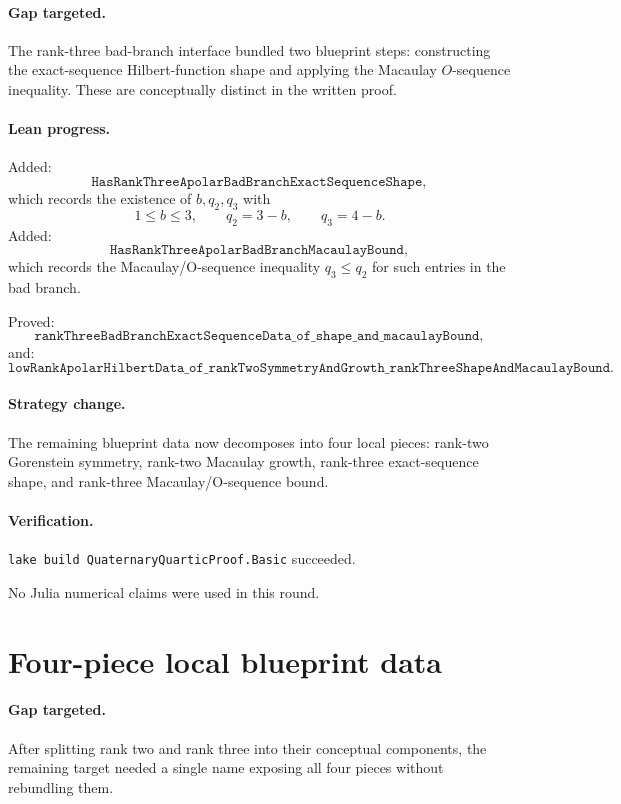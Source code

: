 \documentclass[11pt]{article}
\begin{document}
\paragraph{Gap targeted.}
The rank-three bad-branch interface bundled two blueprint steps: constructing
the exact-sequence Hilbert-function shape and applying the Macaulay
\(O\)-sequence inequality.  These are conceptually distinct in the written
proof.

\paragraph{Lean progress.}
Added:
\[
\texttt{HasRankThreeApolarBadBranchExactSequenceShape},
\]
which records the existence of \(b,q_2,q_3\) with
\[
1\le b\le3,\qquad q_2=3-b,\qquad q_3=4-b.
\]
Added:
\[
\texttt{HasRankThreeApolarBadBranchMacaulayBound},
\]
which records the Macaulay/O-sequence inequality \(q_3\le q_2\) for such
entries in the bad branch.

Proved:
\[
\texttt{rankThreeBadBranchExactSequenceData\_of\_shape\_and\_macaulayBound},
\]
and:
\[
\texttt{lowRankApolarHilbertData\_of\_rankTwoSymmetryAndGrowth\_rankThreeShapeAndMacaulayBound}.
\]

\paragraph{Strategy change.}
The remaining blueprint data now decomposes into four local pieces:
rank-two Gorenstein symmetry, rank-two Macaulay growth, rank-three
exact-sequence shape, and rank-three Macaulay/O-sequence bound.

\paragraph{Verification.}
\texttt{lake build QuaternaryQuarticProof.Basic} succeeded.

No Julia numerical claims were used in this round.

\section*{Four-piece local blueprint data}

\paragraph{Gap targeted.}
After splitting rank two and rank three into their conceptual components, the
remaining target needed a single name exposing all four pieces without
rebundling them.
\end{document}
